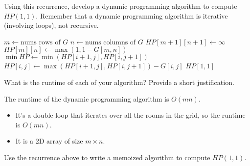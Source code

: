 \documentclass[11pt,fleqn]{exam}
\newenvironment{soln}{\color{solnblue}}{}
\newif\ifsolutions\solutionstrue
\newif\ifsolutions\solutionsfalse
\begin{document}
\begin{questions}
\question[5]
Using this recurrence, 
develop a dynamic programming algorithm  to compute $HP(1,1)$. Remember that a dynamic programming algorithm is iterative (involving loops), not recursive.

\begin{soln}
   \begin{algorithmic}[1]
         \State $m \gets \text{nums rows of } G$
         \State $n \gets \text{nums columns of } G$
         \State $HP[m+1][n+1] \gets \infty$
         \State $HP[m][n] \gets \max(1, 1 - G[m,n])$
               \State $\min HP \gets \min(HP[i+1,j], HP[i,j+1])$
               \State $HP[i,j] \gets \max(HP[i+1,j], HP[i,j+1]) - G[i,j]$
               \EndIf
            \EndFor
         \EndFor
         \State \Return $HP[1,1]$
      \EndFunction
   \end{algorithmic}
\end{soln}


\ifsolutions

\else
\fi

\question[2]
What is the runtime of each of your algorithm?  Provide a short justification.

\begin{soln}
   The runtime of the dynamic programming algorithm is $O(mn)$.
   \begin{itemize}
      \item It's a double loop that iterates over all the rooms in the grid, so the runtime is $O(mn)$.
      \item It is a 2D array of size $m \times n$.
   \end{itemize}
\end{soln}

\ifsolutions

\else
\fi

\question[Optional: 0]
 Use the recurrence above to write a memoized algorithm to compute $HP(1,1)$.
\end{questions}
\end{document}
